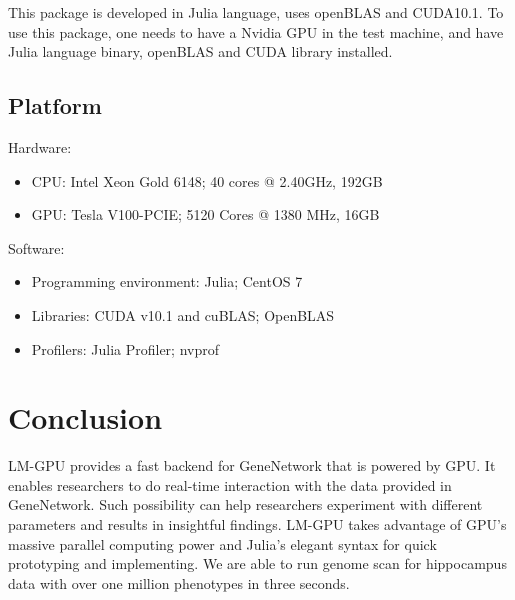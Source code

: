 \documentclass[9pt,twocolumn,twoside,lineno]{gsag3jnl}
\begin{document}
This package is developed in Julia language, uses openBLAS and CUDA10.1. 
To use this package, one needs to have a Nvidia GPU in the test machine,
and have Julia language binary, openBLAS and CUDA library installed. 

\subsection{Platform}
Hardware:
 \begin{itemize}
	\item CPU: Intel Xeon Gold 6148; 40 cores @ 2.40GHz, 192GB 
	\item GPU: Tesla V100-PCIE; 5120 Cores @ 1380 MHz, 16GB
\end{itemize}
Software: 
\begin{itemize}
	\item Programming environment: Julia; CentOS 7
	\item Libraries: CUDA v10.1 and cuBLAS; OpenBLAS
	\item Profilers: Julia Profiler; nvprof
\end{itemize}

\section{Conclusion}


LM-GPU provides a fast backend for GeneNetwork that is powered by GPU. 
It enables researchers to do real-time interaction with the data provided in GeneNetwork. 
Such possibility can help researchers experiment with different parameters and results in insightful findings. 
LM-GPU takes advantage of GPU's massive parallel computing power and Julia's elegant syntax for quick prototyping and implementing. 
We are able to run genome scan for hippocampus data with over one million phenotypes in three seconds. 






\end{document}
